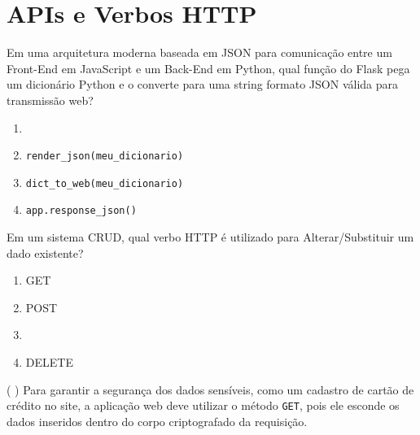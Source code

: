 \documentclass[12pt,a4paper]{article}
\newcommand{\correto}[1]{\iftoggle{gabarito}{\textbf{\color{corGabarito}#1}}{#1}}
\newcommand{\justificativa}[1]{\iftoggle{gabarito}{\vspace{0.2cm}\textbf{\color{corGabarito}Justificativa:} \color{corGabarito}#1}{\vspace{0.8cm}}}
\begin{document}
\newpage
\section{APIs e Verbos HTTP}

\begin{tcolorbox}[colback=white, colframe=azulTitulo, title=Questão 21]
    Em uma arquitetura moderna baseada em JSON para comunicação entre um Front-End em JavaScript e um Back-End em Python, qual função do Flask pega um dicionário Python e o converte para uma string formato JSON válida para transmissão web?
    \begin{enumerate}[label=\alph*)]
        \item \correto{\texttt{jsonify(meu\_dicionario)}}
        \item \texttt{render\_json(meu\_dicionario)}
        \item \texttt{dict\_to\_web(meu\_dicionario)}
        \item \texttt{app.response\_json()}
    \end{enumerate}
\end{tcolorbox}

\begin{tcolorbox}[colback=white, colframe=azulTitulo, title=Questão 22]
    Em um sistema CRUD, qual verbo HTTP é utilizado para Alterar/Substituir um dado existente?
    \begin{enumerate}[label=\alph*)]
        \item GET
        \item POST
        \item \correto{PUT}
        \item DELETE
    \end{enumerate}
\end{tcolorbox}

\begin{tcolorbox}[colback=white, colframe=azulTitulo, title=Questão 23 (V/F)]
    ( ) Para garantir a segurança dos dados sensíveis, como um cadastro de cartão de crédito no site, a aplicação web deve utilizar o método \texttt{GET}, pois ele esconde os dados inseridos dentro do corpo criptografado da requisição.
    \justificativa{Falso. O \texttt{GET} envia os dados pendurados diretamente na URL, escancarados para todos. Para esconder no corpo da requisição utiliza-se o método \texttt{POST}.}
\end{tcolorbox}
\end{document}
